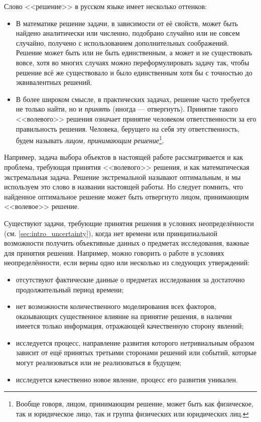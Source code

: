 Слово <<решение>> в русском языке имеет несколько оттенков: 
\begin{itemize}
  \item В математике решение задачи, в зависимости от её свойств, может быть найдено аналитически или численно, подобрано случайно или не совсем случайно, получено с использованием дополнительных соображений. Решение может быть или не быть единственным, а может и не существовать вовсе,  хотя во многих случаях можно переформулировать задачу так, чтобы решение всё же существовало и было единственным хотя бы с точностью до эквивалентных решений. 
  \item В более широком смысле, в практических задачах, решение часто требуется не только найти, но и {\sl принять} (иногда --- отвергнуть). Принятие такого <<волевого>> решения означает принятие человеком ответственности за его правильность решения. Человека, берущего на себя эту ответственность, будем называть {\sl лицом, принимающим решение}\footnote{Вообще говоря, лицом, принимающим решение, может быть как физическое, так и юридическое лицо, так и группа физических или юридических лиц.}. 
\end{itemize}
Например, задача выбора объектов в настоящей работе рассматривается и как проблема, требующая принятия <<волевого>> решения, и как математическая экстремальная задача. Решение экстремальной  называют оптимальным, и мы используем это слово в названии настоящей работы. Но следует помнить, что найденное оптимальное решение может быть отвергнуто лицом, принимающим <<волевое>> решение.

Существуют задачи, требующие принятия решения в условиях неопределённости (см. \ref{sec:intro_uncertainty}), когда нет времени или принципиальной возможности получить объективные данных о предметах исследования, важные для принятия решения. Например, можно говорить о работе в условиях неопределённости, если верны одно или несколько из следующих утверждений:
\begin{itemize}
 \item отсутствуют фактические данные о предметах исследования за достаточно продолжительный период времени; 
 \item нет возможности количественного моделирования всех факторов, оказывающих существенное влияние на принятие решения, в наличии имеется только информация, отражающей качественную сторону явлений; 
 \item исследуется процесс, направление развития которого нетривиальным образом зависит от ещё  принятых третьими сторонами решений или событий, которые могут реализоваться или не реализоваться в будущем;
 \item исследуется качественно новое явление, процесс его развития уникален.
\end{itemize}

